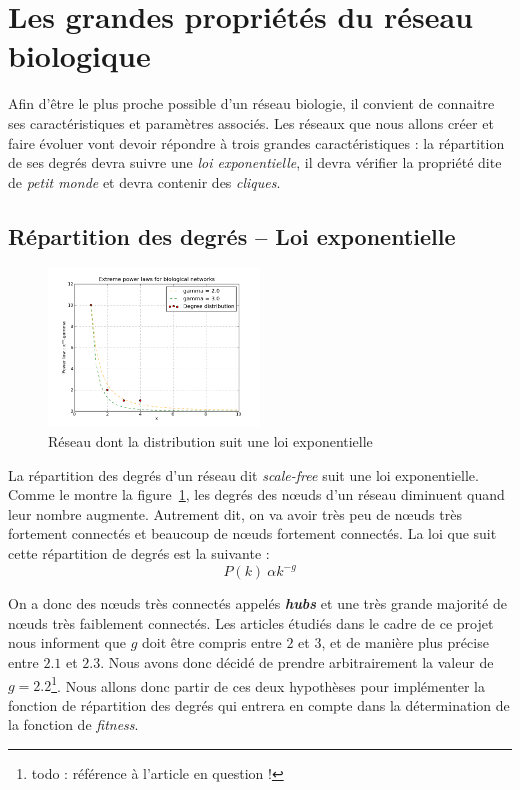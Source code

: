 \section{Les grandes propriétés du réseau biologique}
Afin d'être le plus proche possible d'un réseau biologie, il convient de connaitre ses caractéristiques et paramètres associés. Les réseaux que nous allons créer et faire évoluer vont devoir répondre à trois grandes caractéristiques : la répartition de ses degrés devra suivre une \textit{loi exponentielle}, il devra vérifier la propriété dite de \textit{\og petit monde \fg} et devra contenir des \textit{cliques}.

\subsection{Répartition des degrés -- Loi exponentielle}
\begin{figure}
  \vspace{-30pt}
  \begin{center}
    \includegraphics[width=0.50\textwidth]{plot.png}
  \end{center}
  \caption{Réseau dont la distribution suit une loi exponentielle}
  \label{scalefree}
\end{figure}
La répartition des degrés d'un réseau dit \textit{scale-free} suit une loi exponentielle. Comme le montre la figure~\ref{scalefree}, les degrés des nœuds d'un réseau diminuent quand leur nombre augmente. Autrement dit, on va avoir très peu de nœuds très fortement connectés et beaucoup de nœuds fortement connectés. La loi que suit cette répartition de degrés est la suivante :
$$ P(k) ~ \alpha k^{-g} $$

On a donc des nœuds très connectés appelés \textit{\textbf{hubs}} et une très grande majorité de nœuds très faiblement connectés.	Les articles étudiés dans le cadre de ce projet nous informent que $g$ doit être compris entre $2$ et $3$, et de manière plus précise entre $2.1$ et $2.3$. Nous avons donc décidé de prendre arbitrairement la valeur de $g=2.2$\footnote{todo : référence à l'article en question !}. Nous allons donc partir de ces deux hypothèses pour implémenter la fonction de répartition des degrés qui entrera en compte dans la détermination de la fonction de \textit{fitness}.

